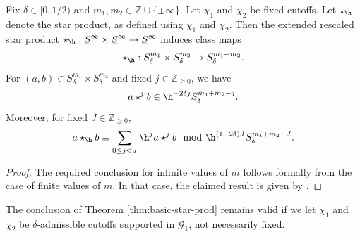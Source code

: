 \begin{theorem}\label{thm:basic-star-prod}
  Fix $\delta \in [0,1/2)$ and $m_1, m_2 \in \mathbb{Z} \cup \{\pm \infty \}$.  Let $\chi_{1}$ and $\chi_2$ be fixed cutoffs.  Let $\star_{\h}$ denote the star product, as defined using $\chi_1$ and $\chi_2$.  Then the extended rescaled star product $\star_{\h} : \underline{S}^\infty \times \underline{S}^\infty \rightarrow \underline{S}^\infty$ induces class maps
  \begin{equation*}
    \star_{\h} : S_{\delta}^{m_1} \times S_{\delta}^{m_2} \rightarrow S_{\delta}^{m_1 + m_2}.
  \end{equation*}
  For $(a,b) \in S_{\delta}^{m_1} \times S_{\delta}^{m_2}$ and fixed $j \in \mathbb{Z}_{\geq 0}$, we have
  \begin{equation*}
    a \star^j b \in \h^{-2 \delta j} S_\delta^{m_1 + m_2 - j}.
  \end{equation*}
  Moreover, for fixed $J \in \mathbb{Z}_{\geq 0}$,
  \begin{equation*}
    a \star_{\h} b \equiv \sum_{0 \leq j < J} \h^j a \star^j b \mod{
      \h^{(1 - 2 \delta) J} S_\delta  ^{m_1 + m_2 - J}.
    }
  \end{equation*}
\end{theorem}
\begin{proof}
  The required conclusion for infinite values of $m$ follows formally from the case of finite values of $m$.  In that case, the claimed result is given by \cite[Thm 9.5]{2020arXiv201202187N}.
\end{proof}
\begin{lemma}\label{lem:concl-theor-refthm:b}
  The conclusion of Theorem \ref{thm:basic-star-prod} remains valid if we let $\chi_1$ and $\chi_2$ be $\delta$-admissible cutoffs supported in $\mathcal{G}_1$, not necessarily fixed.
\end{lemma}

